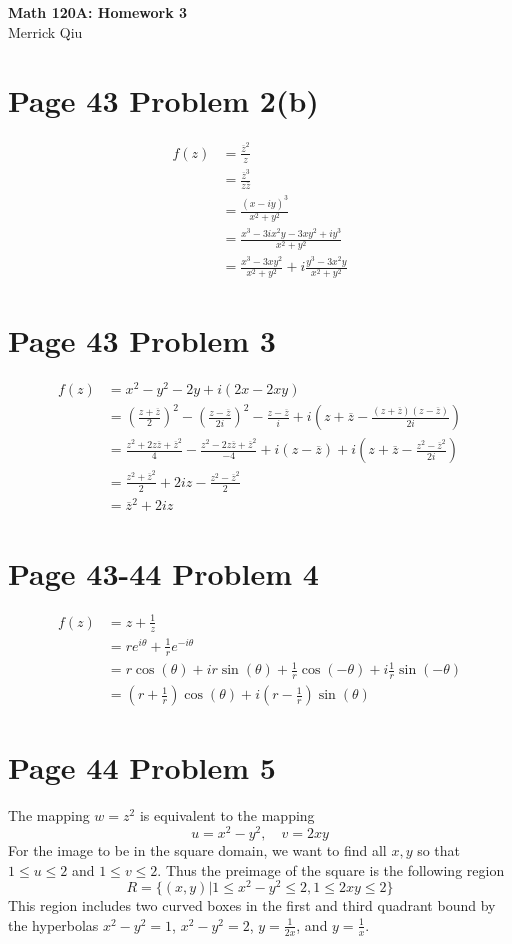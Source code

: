 \documentclass{article}
\newcommand{\cjg}[1]{\overline{#1}}
\begin{document}
\begin{center}
	\huge{\bf Math 120A: Homework 3} \\
	Merrick Qiu
\end{center}
\section*{Page 43 Problem 2(b)}
\begin{align*}
	f(z) &= \frac{\cjg{z}^2}{z} \\
	&= \frac{\cjg{z}^3}{z\cjg{z}} \\
	&= \frac{(x-iy)^3}{x^2+y^2} \\
	&= \frac{x^3 - 3ix^2y - 3xy^2 + iy^3}{x^2+y^2} \\
	&= \frac{x^3-3xy^2}{x^2+y^2} + i\frac{y^3-3x^2y}{x^2+y^2}
\end{align*}
\section*{Page 43 Problem 3}
\begin{align*}
	f(z) &= x^2 - y^2 -2y +i(2x-2xy)\\
	&= \left(\frac{z+\cjg{z}}{2}\right)^2 - \left(\frac{z-\cjg{z}}{2i}\right)^2 - \frac{z-\cjg{z}}{i} + i\left(z+\cjg{z} - \frac{(z+\cjg{z})(z-\cjg{z})}{2i}\right)\\
	&=  \frac{z^2+2z\cjg{z}+\cjg{z}^2}{4} - \frac{z^2-2z\cjg{z}+\cjg{z}^2}{-4} + i(z-\cjg{z}) + i\left(z+\cjg{z} - \frac{z^2 - \cjg{z}^2}{2i}\right)\\
	&= \frac{z^2+\cjg{z}^2}{2} + 2iz - \frac{z^2 - \cjg{z}^2}{2} \\
	&= \cjg{z}^2 + 2iz
\end{align*}

\section*{Page 43-44 Problem 4}
\begin{align*}
	f(z) &= z + \frac{1}{z} \\
	&= re^{i\theta} + \frac{1}{r}e^{-i\theta} \\
	&= r\cos(\theta) + ir\sin(\theta) + \frac{1}{r}\cos(-\theta) + i\frac{1}{r}\sin(-\theta) \\
	&= \left(r + \frac{1}{r}\right)\cos(\theta) + i\left(r - \frac{1}{r}\right)\sin(\theta)
\end{align*}

\section*{Page 44 Problem 5} 
The mapping $w = z^2$ is equivalent to the mapping 
\[
	u = x^2 - y^2, \quad v = 2xy
\]
For the image to be in the square domain, 
we want to find all $x,y$ so that 
$1 \leq u \leq 2$ and $1 \leq v \leq 2$.
Thus the preimage of the square is the following region
\[
	R = \{(x,y) | 1 \leq x^2-y^2 \leq 2, 1 \leq 2xy \leq 2\}
\]
This region includes two curved boxes in the 
first and third quadrant bound by the hyperbolas
$x^2-y^2 = 1$, $x^2-y^2 = 2$, $y = \frac{1}{2x}$, and $y = \frac{1}{x}$.
\end{document}
